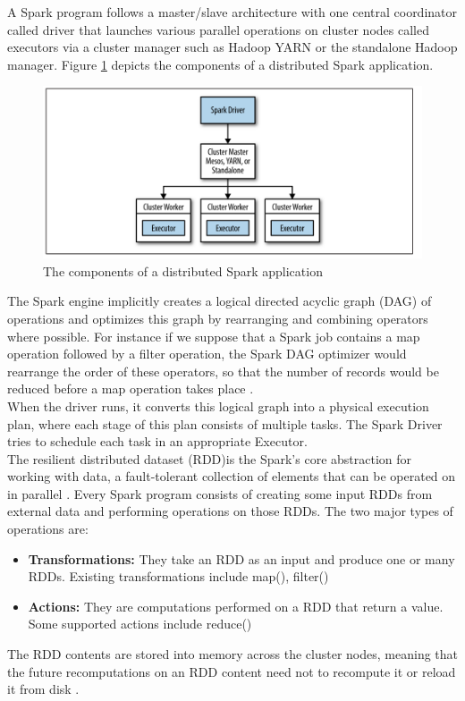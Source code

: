 A Spark program follows a master/slave architecture with one central coordinator called driver that launches
various parallel operations on cluster nodes called executors via a cluster manager such as Hadoop YARN or the standalone Hadoop manager. Figure \ref{spark} depicts the components of a distributed Spark application.
				\begin{figure}[h!]
					\centering
					\includegraphics[scale=0.9]{graphics/spark.PNG} 
					\caption{The components of a distributed Spark application\cite{a:Spark2}} \label{spark} 
				\end{figure}
				The Spark engine implicitly creates a logical directed acyclic graph (DAG) of operations and optimizes this graph by rearranging and combining operators where possible. For instance if we suppose that a Spark job contains a map operation followed by a filter operation, the Spark DAG optimizer would rearrange the order of these operators, so that the number of records would be reduced before a map operation takes place \cite{a:Spark2}.\\
When the driver runs, it converts this logical graph into a physical execution plan, where each stage of this plan consists of multiple tasks. The Spark Driver tries to schedule each task in an appropriate Executor.\\ 
				The resilient distributed dataset (RDD)is the Spark’s core abstraction for working with data,  a fault-tolerant collection of elements that can be operated on in parallel \cite{a:Spark3}.
Every Spark program consists of creating some input RDDs from external data and performing operations on those RDDs. The two major types of operations are:
\begin{itemize}
\item \textbf{Transformations:} They take an RDD as an input and produce one or many RDDs. Existing transformations include map(), filter()%
\item \textbf{Actions:} They are computations performed on a RDD that return a value. Some supported actions include reduce()%
\end{itemize}
The RDD contents are stored into memory across the cluster nodes, meaning that the future recomputations on an RDD content need not to recompute it or reload it from disk \cite{a:Spark1}.
